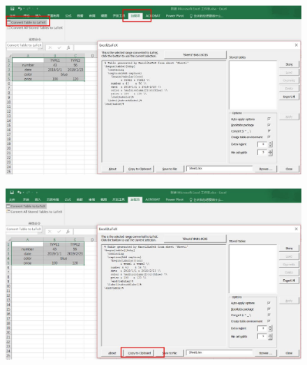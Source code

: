\documentclass[12pt]{elegantpaper} %
\begin{document}
\begin{figure}	
	\centering	
	\includegraphics[width=\linewidth]{figure/excel2.jpg}	
\end{figure}

\begin{figure}	
	\centering	
	\includegraphics[width=\linewidth]{figure/excel3.jpg}	
\end{figure}
\end{document}
